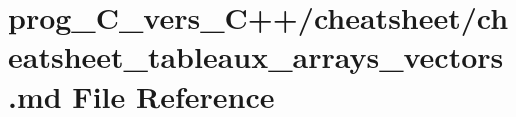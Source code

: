 \hypertarget{prog__C__vers__C_09_09_2cheatsheet_2cheatsheet__tableaux__arrays__vectors_8md}{}\section{prog\+\_\+\+C\+\_\+vers\+\_\+\+C++/cheatsheet/cheatsheet\+\_\+tableaux\+\_\+arrays\+\_\+vectors.md File Reference}
\label{prog__C__vers__C_09_09_2cheatsheet_2cheatsheet__tableaux__arrays__vectors_8md}
